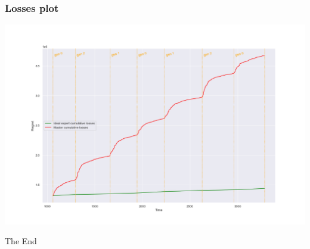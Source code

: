 \begin{frame}
\frametitle{Losses plot}
\includegraphics[width=1\linewidth]{fig}

\end{frame}


%




\begin{frame}
\Huge{\centerline{The End}}
\end{frame}


